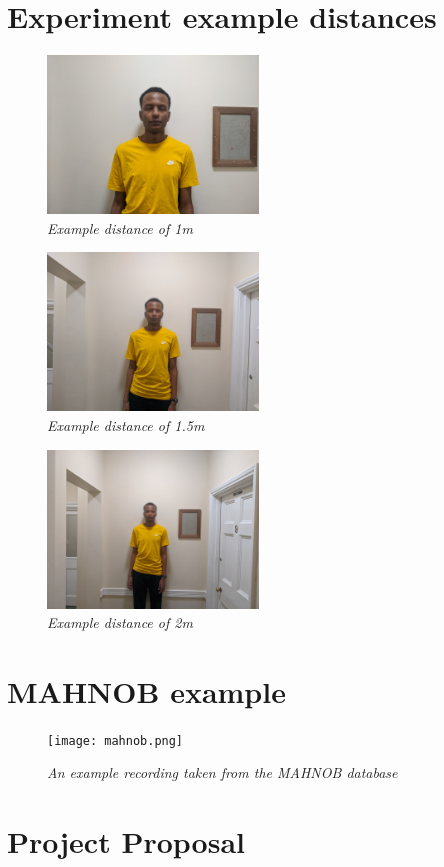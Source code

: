 \documentclass[12pt,twoside,notitlepage]{report}
\begin{document}
\begin{appendices}
\chapter{Experiment example distances}
\label{appendix:experiments}
\begin{figure}[H]
    \centering
    \includegraphics[width=0.5\textwidth]{evaluation/1.jpg}
   \caption{\textit{Example distance of 1m}}
\end{figure}
\begin{figure}[H]
    \centering
    \includegraphics[width=0.5\textwidth]{evaluation/1-5.jpg}
   \caption{\textit{Example distance of 1.5m} }
\end{figure}
\begin{figure}[H]
    \centering
    \includegraphics[width=0.5\textwidth]{evaluation/2.jpg}
    \caption{\textit{Example distance of 2m} }
\end{figure}

\chapter{MAHNOB example}
\begin{figure}[H]
    \centering
    \texttt{[image: mahnob.png]}
    \caption{\textit{An example recording taken from the MAHNOB \cite{Mahnob} database} }
\end{figure}


\cleardoublepage
\chapter{Project Proposal}

\end{appendices}
% 
\end{document}
